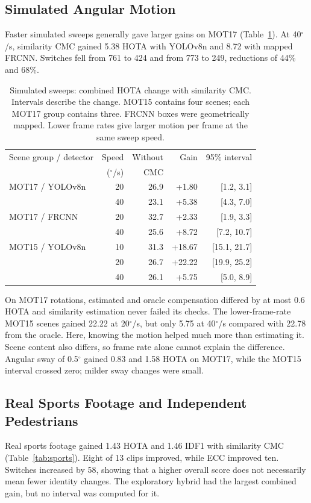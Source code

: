 \documentclass[conference]{IEEEtran}
\begin{document}
\subsection{Simulated Angular Motion}
Faster simulated sweeps generally gave larger gains on MOT17 (Table~\ref{tab:ptz}). At 40$^\circ$/s, similarity CMC gained 5.38 HOTA with YOLOv8n and 8.72 with mapped FRCNN. Switches fell from 761 to 424 and from 773 to 249, reductions of 44\% and 68\%.

\begin{table}[t]
\caption{Simulated sweeps: combined HOTA change with similarity CMC. Intervals describe the change. MOT15 contains four scenes; each MOT17 group contains three. FRCNN boxes were geometrically mapped. Lower frame rates give larger motion per frame at the same sweep speed.}
\label{tab:ptz}
\centering\footnotesize\setlength{\tabcolsep}{4pt}
\begin{tabular}{@{}lrrrr@{}}
\toprule
Scene group / detector & Speed & Without & Gain & 95\% interval\\
 & ($^\circ$/s) & CMC & & \\
\midrule
MOT17 / YOLOv8n & 20 & 26.9 & +1.80 & [1.2, 3.1]\\
 & 40 & 23.1 & +5.38 & [4.3, 7.0]\\
MOT17 / FRCNN & 20 & 32.7 & +2.33 & [1.9, 3.3]\\
 & 40 & 25.6 & +8.72 & [7.2, 10.7]\\
MOT15 / YOLOv8n & 10 & 31.3 & +18.67 & [15.1, 21.7]\\
 & 20 & 26.7 & +22.22 & [19.9, 25.2]\\
 & 40 & 26.1 & +5.75 & [5.0, 8.9]\\
\bottomrule
\end{tabular}
\end{table}

On MOT17 rotations, estimated and oracle compensation differed by at most 0.6 HOTA and similarity estimation never failed its checks. The lower-frame-rate MOT15 scenes gained 22.22 at 20$^\circ$/s, but only 5.75 at 40$^\circ$/s compared with 22.78 from the oracle. Here, knowing the motion helped much more than estimating it. Scene content also differs, so frame rate alone cannot explain the difference. Angular sway of 0.5$^\circ$ gained 0.83 and 1.58 HOTA on MOT17, while the MOT15 interval crossed zero; milder sway changes were small.

\subsection{Real Sports Footage and Independent Pedestrians}
Real sports footage gained 1.43 HOTA and 1.46 IDF1 with similarity CMC (Table~\ref{tab:sports}). Eight of 13 clips improved, while ECC improved ten. Switches increased by 58, showing that a higher overall score does not necessarily mean fewer identity changes. The exploratory hybrid had the largest combined gain, but no interval was computed for it.
\end{document}

